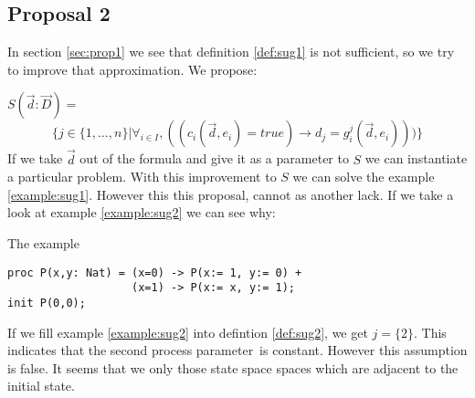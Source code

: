 \documentclass[a4paper,10pt]{article}
\newcommand{\ovr}{\overrightarrow}
\newcommand{\pp}{process parameter}
\begin{document}
\subsection{Proposal 2}
In section \ref{sec:prop1} we see that definition \ref{def:sug1} is not sufficient, so we try to improve that approximation.
We propose:
\begin{defn} \label{def:sug2}
$S(\ovr{d}:\ovr{D})=$
\begin{displaymath}
\lbrace   
j \in \lbrace 1, \ldots , n \rbrace \vert \forall_{i\in I}, ((c_i(\ovr{d},e_i) = true) \rightarrow d_j = g_i^j(\ovr{d},e_i)))\rbrace
\end{displaymath}
If we take $\ovr{d}$ out of the formula and give it as a parameter to $S$ we can instantiate a particular problem.
With this improvement to $S$ we can solve the example \ref{example:sug1}. However this this proposal, cannot as another lack. If we take a look at example \ref{example:sug2} we can see why:
\begin{example} \label{example:sug2} The example \\
\begin{verbatim} 
proc P(x,y: Nat) = (x=0) -> P(x:= 1, y:= 0) +
                   (x=1) -> P(x:= x, y:= 1);
init P(0,0);
\end{verbatim}

\end{example}
If we fill example \ref{example:sug2} into defintion \ref{def:sug2}, we get $j = \lbrace 2 \rbrace$. This indicates that the second \pp\ is constant. However this assumption is false. It seems that we only those state space spaces which are adjacent to the initial state.
\end{defn}
\end{document}
